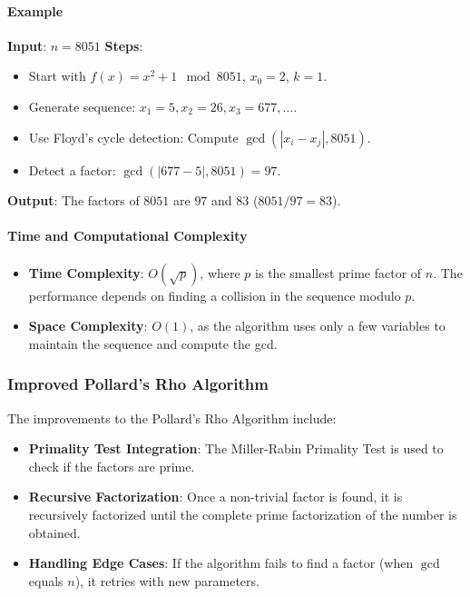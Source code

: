 \documentclass[12pt]{report}
\begin{document}
\paragraph{Example}

\textbf{Input}: $n = 8051$ 
\textbf{Steps}:
\begin{itemize}
    \item Start with $f(x) = x^2 + 1 \mod 8051$, $x_0 = 2$, $k = 1$.
    \item Generate sequence: $x_1 = 5, x_2 = 26, x_3 = 677, \ldots$.
    \item Use Floyd's cycle detection: Compute $\gcd(|x_i - x_j|, 8051)$. 
    \item Detect a factor: $\gcd(|677 - 5|, 8051) = 97$.
\end{itemize}

\textbf{Output}: The factors of $8051$ are $97$ and $83$ ($8051 / 97 = 83$).

\paragraph{Time and Computational Complexity}

\begin{itemize}
    \item \textbf{Time Complexity}: $O(\sqrt{p})$, where $p$ is the smallest prime factor of $n$. The performance depends on finding a collision in the sequence modulo $p$.
    \item \textbf{Space Complexity}: $O(1)$, as the algorithm uses only a few variables to maintain the sequence and compute the gcd.
\end{itemize}

\subsubsection{Improved Pollard's Rho Algorithm}

The improvements to the Pollard's Rho Algorithm include:
\begin{itemize}
    \item \textbf{Primality Test Integration}: The Miller-Rabin Primality Test is used to check if the factors are prime.
    \item \textbf{Recursive Factorization}: Once a non-trivial factor is found, it is recursively factorized until the complete prime factorization of the number is obtained.
    \item \textbf{Handling Edge Cases}: If the algorithm fails to find a factor (when $\gcd$ equals $n$), it retries with new parameters.
\end{itemize}
\end{document}
